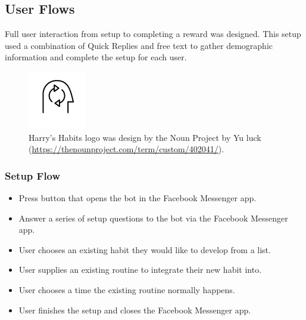 \subsection{User Flows} \label{user_flow}
Full user interaction from setup to completing a reward was designed. This setup used a combination of Quick Replies and free text to gather demographic information and complete the setup for each user.

\begin{figure}[H]
  \centering
  \includegraphics[width=1in]{../resources/logo.png}
  \caption{Harry's Habits logo was design by the Noun Project by Yu luck (\url{https://thenounproject.com/term/custom/402041/}).}
  \label{fig:logo}
\end{figure}


\subsubsection{Setup Flow} \label{setup_flow}

\begin{itemize}
  \item Press button that opens the bot in the Facebook Messenger app.
  \item Answer a series of setup questions to the bot via the Facebook Messenger app.
  \item User chooses an existing habit they would like to develop from a list.
  \item User supplies an existing routine to integrate their new habit into.
  \item User chooses a time the existing routine normally happens.
  \item User finishes the setup and closes the Facebook Messenger app.
\end{itemize}


